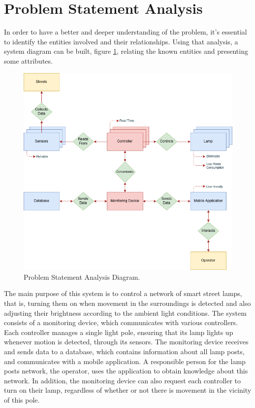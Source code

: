 \documentclass[12pt, letterpaper]{report}
\begin{document}
\section{Problem Statement Analysis}
In order to have a better and deeper understanding of the problem, it’s essential to identify the entities involved and their relationships. Using that analysis, a system diagram can be built, figure \ref{fig:Problem_statement_analysis}, relating the known entities and presenting some attributes.

{\begin{figure}[ht]
	\centering
	\includegraphics[width=1\textwidth]{Problem_statement_analysis}
	\caption{Problem Statement Analysis Diagram.}
	\label{fig:Problem_statement_analysis}
\end{figure}}

The main purpose of this system is to control a network of smart street lamps, that is, turning them on when movement in the surroundings is detected and also adjusting their brightness according to the ambient light conditions. The system consists of a monitoring device, which communicates with various controllers. Each controller manages a single light pole, ensuring that its lamp lights up whenever motion is detected, through its sensors. The monitoring device receives and sends data to a database, which contains information about all lamp posts, and communicates with a mobile application. A responsible person for the lamp posts network, the operator, uses the application to obtain knowledge about this network. In addition, the monitoring device can also request each controller to turn on their lamp, regardless of whether or not there is movement in the vicinity of this pole.
\end{document}
